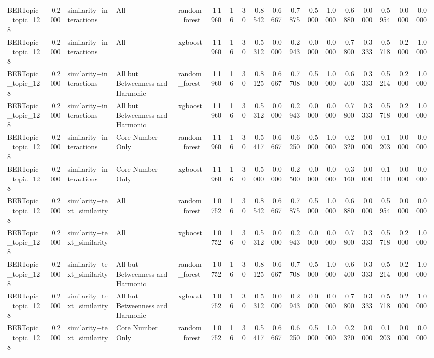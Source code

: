 \begin{tabular}{lrlllrrrrrrrrrrrrr}
BERTopic_topic_128 & 0.2000 & similarity+interactions & All & random_forest & 1.1960 & 16 & 30 & 0.8542 & 0.6667 & 0.7875 & 0.5000 & 1.0000 & 0.6880 & 0.0000 & 0.5954 & 0.0000 & 0.0000 \\
BERTopic_topic_128 & 0.2000 & similarity+interactions & All & xgboost & 1.1960 & 16 & 30 & 0.5312 & 0.0000 & 0.2943 & 0.0000 & 0.0000 & 0.7800 & 0.3333 & 0.5718 & 0.2000 & 1.0000 \\
BERTopic_topic_128 & 0.2000 & similarity+interactions & All but Betweenness and Harmonic & random_forest & 1.1960 & 16 & 30 & 0.8125 & 0.6667 & 0.7708 & 0.5000 & 1.0000 & 0.6400 & 0.3333 & 0.5214 & 0.2000 & 1.0000 \\
BERTopic_topic_128 & 0.2000 & similarity+interactions & All but Betweenness and Harmonic & xgboost & 1.1960 & 16 & 30 & 0.5312 & 0.0000 & 0.2943 & 0.0000 & 0.0000 & 0.7800 & 0.3333 & 0.5718 & 0.2000 & 1.0000 \\
BERTopic_topic_128 & 0.2000 & similarity+interactions & Core Number Only & random_forest & 1.1960 & 16 & 30 & 0.5417 & 0.6667 & 0.6250 & 0.5000 & 1.0000 & 0.2320 & 0.0000 & 0.1203 & 0.0000 & 0.0000 \\
BERTopic_topic_128 & 0.2000 & similarity+interactions & Core Number Only & xgboost & 1.1960 & 16 & 30 & 0.5000 & 0.0000 & 0.2500 & 0.0000 & 0.0000 & 0.3160 & 0.0000 & 0.1410 & 0.0000 & 0.0000 \\
BERTopic_topic_128 & 0.2000 & similarity+text_similarity & All & random_forest & 1.0752 & 16 & 30 & 0.8542 & 0.6667 & 0.7875 & 0.5000 & 1.0000 & 0.6880 & 0.0000 & 0.5954 & 0.0000 & 0.0000 \\
BERTopic_topic_128 & 0.2000 & similarity+text_similarity & All & xgboost & 1.0752 & 16 & 30 & 0.5312 & 0.0000 & 0.2943 & 0.0000 & 0.0000 & 0.7800 & 0.3333 & 0.5718 & 0.2000 & 1.0000 \\
BERTopic_topic_128 & 0.2000 & similarity+text_similarity & All but Betweenness and Harmonic & random_forest & 1.0752 & 16 & 30 & 0.8125 & 0.6667 & 0.7708 & 0.5000 & 1.0000 & 0.6400 & 0.3333 & 0.5214 & 0.2000 & 1.0000 \\
BERTopic_topic_128 & 0.2000 & similarity+text_similarity & All but Betweenness and Harmonic & xgboost & 1.0752 & 16 & 30 & 0.5312 & 0.0000 & 0.2943 & 0.0000 & 0.0000 & 0.7800 & 0.3333 & 0.5718 & 0.2000 & 1.0000 \\
BERTopic_topic_128 & 0.2000 & similarity+text_similarity & Core Number Only & random_forest & 1.0752 & 16 & 30 & 0.5417 & 0.6667 & 0.6250 & 0.5000 & 1.0000 & 0.2320 & 0.0000 & 0.1203 & 0.0000 & 0.0000 \\

\end{tabular}
